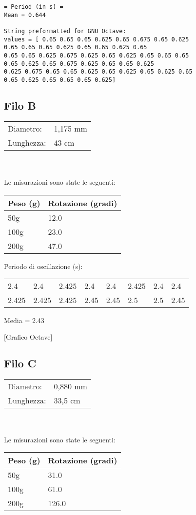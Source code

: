 \documentclass[a4paper,10pt]{report}
\begin{document}
\begin{verbatim}
= Period (in s) =
Mean = 0.644

String preformatted for GNU Octave:
values = [ 0.65 0.65 0.65 0.625 0.65 0.675 0.65 0.625
0.65 0.65 0.65 0.625 0.65 0.65 0.625 0.65
0.65 0.65 0.625 0.675 0.625 0.65 0.625 0.65 0.65 0.65
0.65 0.625 0.65 0.675 0.625 0.65 0.65 0.625
0.625 0.675 0.65 0.65 0.625 0.65 0.625 0.65 0.625 0.65
0.65 0.625 0.65 0.65 0.65 0.625]
\end{verbatim}

\subsection{Filo B}
\begin{tabular}{ll}
Diametro:  & 1,175 mm \\
Lunghezza: & 43 cm \\

\end{tabular}
\\ \\
Le misurazioni sono state le seguenti:
\begin{center}
\begin{tabular}{|l|l|}
\toprule
Peso (g) & Rotazione (gradi)\\
\midrule
50g & 12.0 \\
100g & 23.0 \\
200g & 47.0 \\
\bottomrule
\end{tabular}
\end{center}
Periodo di oscillazione (s):
\\
\begin{center}
\begin{tabular}{llllllll}
2.4   & 2.4   & 2.425 & 2.4  & 2.4   & 2.425 & 2.4  & 2.4 \\
2.425 & 2.425 & 2.425 & 2.45 & 2.45  & 2.5   & 2.5  & 2.45 \\
\end{tabular}
\end{center}
Media = 2.43

[Grafico Octave]

\subsection{Filo C}
\begin{tabular}{ll}
Diametro: & 0,880 mm \\
Lunghezza: & 33,5 cm \\
\end{tabular}
\\ \\Le misurazioni sono state le seguenti:
\begin{center}
\begin{tabular}{|l|l|}
\toprule
Peso (g) & Rotazione (gradi)\\
\midrule
50g & 31.0 \\
100g & 61.0 \\
200g & 126.0 \\
\bottomrule
\end{tabular}
\end{center}
\end{document}
